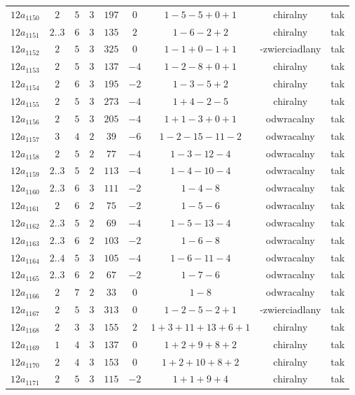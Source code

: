 \begin{longtable}{ccccccccc}
$12a_{1150}$ & $2$ & $5$ & $3$ & $197$ & $0$ & $1-5-5+0+1$ & chiralny & tak \\
$12a_{1151}$ & $2..3$ & $6$ & $3$ & $135$ & $2$ & $1-6-2+2$ & chiralny & tak \\
$12a_{1152}$ & $2$ & $5$ & $3$ & $325$ & $0$ & $1-1+0-1+1$ & -zwierciadlany & tak \\
$12a_{1153}$ & $2$ & $5$ & $3$ & $137$ & $-4$ & $1-2-8+0+1$ & chiralny & tak \\
$12a_{1154}$ & $2$ & $6$ & $3$ & $195$ & $-2$ & $1-3-5+2$ & chiralny & tak \\
$12a_{1155}$ & $2$ & $5$ & $3$ & $273$ & $-4$ & $1+4-2-5$ & chiralny & tak \\
$12a_{1156}$ & $2$ & $5$ & $3$ & $205$ & $-4$ & $1+1-3+0+1$ & odwracalny & tak \\
$12a_{1157}$ & $3$ & $4$ & $2$ & $39$ & $-6$ & $1-2-15-11-2$ & odwracalny & tak \\
$12a_{1158}$ & $2$ & $5$ & $2$ & $77$ & $-4$ & $1-3-12-4$ & odwracalny & tak \\
$12a_{1159}$ & $2..3$ & $5$ & $2$ & $113$ & $-4$ & $1-4-10-4$ & odwracalny & tak \\
$12a_{1160}$ & $2..3$ & $6$ & $3$ & $111$ & $-2$ & $1-4-8$ & odwracalny & tak \\
$12a_{1161}$ & $2$ & $6$ & $2$ & $75$ & $-2$ & $1-5-6$ & odwracalny & tak \\
$12a_{1162}$ & $2..3$ & $5$ & $2$ & $69$ & $-4$ & $1-5-13-4$ & odwracalny & tak \\
$12a_{1163}$ & $2..3$ & $6$ & $2$ & $103$ & $-2$ & $1-6-8$ & odwracalny & tak \\
$12a_{1164}$ & $2..4$ & $5$ & $3$ & $105$ & $-4$ & $1-6-11-4$ & odwracalny & tak \\
$12a_{1165}$ & $2..3$ & $6$ & $2$ & $67$ & $-2$ & $1-7-6$ & odwracalny & tak \\
$12a_{1166}$ & $2$ & $7$ & $2$ & $33$ & $0$ & $1-8$ & odwracalny & tak \\
$12a_{1167}$ & $2$ & $5$ & $3$ & $313$ & $0$ & $1-2-5-2+1$ & -zwierciadlany & tak \\
$12a_{1168}$ & $2$ & $3$ & $3$ & $155$ & $2$ & $1+3+11+13+6+1$ & chiralny & tak \\
$12a_{1169}$ & $1$ & $4$ & $3$ & $137$ & $0$ & $1+2+9+8+2$ & chiralny & tak \\
$12a_{1170}$ & $2$ & $4$ & $3$ & $153$ & $0$ & $1+2+10+8+2$ & chiralny & tak \\
$12a_{1171}$ & $2$ & $5$ & $3$ & $115$ & $-2$ & $1+1+9+4$ & chiralny & tak \\

\end{longtable}
